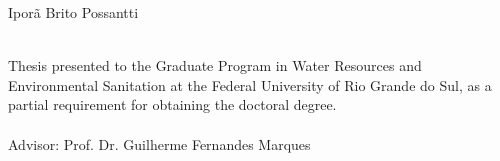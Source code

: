 \documentclass[./main_en.tex]{subfiles}
\begin{document}
\doublespacing %
\large

\newpage
\renewcommand{\headrulewidth}{0pt}
\thispagestyle{fancy}
\fancyhf{} %
\fancyfoot{} %
\fancyfoot[C]{\thepage}

\begin{center}
	\selectfont Iporã Brito Possantti\\
	\vspace{30mm}
	\selectfont \docTitleEn\\
	\vspace{30mm}
\end{center}
\begin{adjustwidth}{250pt}{0pt}
	\singlespacing
	\selectfont Thesis presented to the Graduate Program in Water Resources and Environmental Sanitation at the Federal University of Rio Grande do Sul, as a partial requirement for obtaining the doctoral degree. \\ \\ Advisor: Prof. Dr. Guilherme Fernandes Marques 
\end{adjustwidth}

\clearpage
\end{document}
